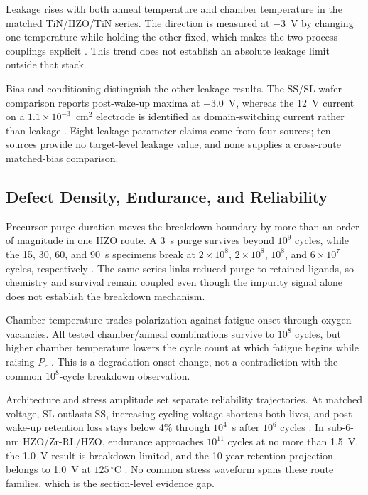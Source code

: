 \documentclass[11pt,a4paper]{report}
\begin{document}
Leakage rises with both anneal temperature and chamber temperature in the matched TiN/HZO/TiN series. The direction is measured at $-3$~V by changing one temperature while holding the other fixed, which makes the two process couplings explicit \cite{choi2022chamber}. This trend does not establish an absolute leakage limit outside that stack.

Bias and conditioning distinguish the other leakage results. The SS/SL wafer comparison reports post-wake-up maxima at $\pm3.0$~V, whereas the 12~V current on a $1.1\times10^{-3}$~cm$^2$ electrode is identified as domain-switching current rather than leakage \cite{zhang2015inductive,kaatranen2026unif}. Eight leakage-parameter claims come from four sources; ten sources provide no target-level leakage value, and none supplies a cross-route matched-bias comparison.
\subsection{Defect Density, Endurance, and Reliability}
\label{sec:ald-reliability}

Precursor-purge duration moves the breakdown boundary by more than an order of magnitude in one HZO route. A 3~s purge survives beyond $10^9$ cycles, while the 15, 30, 60, and 90~s specimens break at $2\times10^8$, $2\times10^8$, $10^8$, and $6\times10^7$ cycles, respectively \cite{choi2025purge}. The same series links reduced purge to retained ligands, so chemistry and survival remain coupled even though the impurity signal alone does not establish the breakdown mechanism.

Chamber temperature trades polarization against fatigue onset through oxygen vacancies. All tested chamber/anneal combinations survive to $10^8$ cycles, but higher chamber temperature lowers the cycle count at which fatigue begins while raising $P_r$ \cite{choi2022chamber}. This is a degradation-onset change, not a contradiction with the common $10^8$-cycle breakdown observation.

Architecture and stress amplitude set separate reliability trajectories. At matched voltage, SL outlasts SS, increasing cycling voltage shortens both lives, and post-wake-up retention loss stays below 4\% through $10^4$~s after $10^6$ cycles \cite{kaatranen2026unif}. In sub-6-nm HZO/Zr-RL/HZO, endurance approaches $10^{11}$ cycles at no more than 1.5~V, the 1.0~V result is breakdown-limited, and the 10-year retention projection belongs to 1.0~V at $125\,^{\circ}$C \cite{liu2025zrrich}. No common stress waveform spans these route families, which is the section-level evidence gap.
\end{document}
